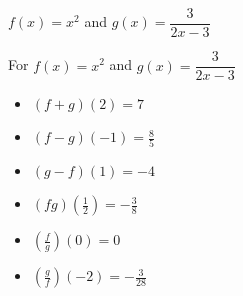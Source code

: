 {$f(x) = x^2$ and $g(x) = \dfrac{3}{2x-3}$}
{For  $f(x) = x^2$ and $g(x) = \dfrac{3}{2x-3}$

\begin{multicols}{2}
\begin{itemize}
\item  $(f+g)(2) = 7$
\item  $(f-g)(-1) = \frac{8}{5}$
\item  $(g-f)(1) = -4$
\item  $(fg)\left(\frac{1}{2}\right) = -\frac{3}{8}$
\item  $\left(\frac{f}{g}\right)(0) = 0$
\item  $\left(\frac{g}{f}\right)\left(-2\right) = -\frac{3}{28}$
\end{itemize}
\end{multicols}
}